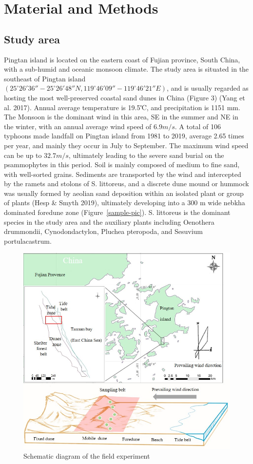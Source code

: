 \documentclass[]{interact}
\theoremstyle{plain}%
\theoremstyle{definition}
\theoremstyle{remark}
\begin{document}
\section{Material and Methods}
\subsection{Study area}

Pingtan island is located on the eastern coast of Fujian province, South China, with a sub-humid and oceanic monsoon climate. The study area is situated in the southeast of Pingtan island $(25^{\circ}26'36''-25^{\circ}26'48''N, 119^{\circ}46'09''-119^{\circ}46'21''E)$, and is usually regarded as hosting the most well-preserved coastal sand dunes in China (Figure 3) (Yang et al. 2017). Annual average temperature is 19.5℃, and precipitation is 1151 mm. The Monsoon is the dominant wind in this area, SE in the summer and NE in the winter, with an annual average wind speed of $6.9 m/s$. A total of 106 typhoons made landfall on Pingtan island from 1981 to 2019, average 2.65 times per year, and mainly they occur in July to September. The maximum wind speed can be up to $32.7 m/s$, ultimately leading to the severe sand burial on the psammophytes in this period. Soil is mainly composed of medium to fine sand, with well-sorted grains. Sediments are transported by the wind and intercepted by the ramets and stolons of S. littoreus, and a discrete dune mound or hummock was usually formed by aeolian sand deposition within an isolated plant or group of plants (Hesp \& Smyth 2019), ultimately developing into a 300 m wide nebkha dominated foredune zone (Figure~\ref{sample-pic}). S. littoreus is the dominant species in the study area and the auxiliary plants including Oenothera drummondii, Cynodondactylon, Pluchea pteropoda, and Sesuvium portulacastrum. 

\begin{figure}
  \centering
  \includegraphics[scale=0.8]{../figs/study_area.jpg}
  \caption{Schematic diagram of the field experiment} 
  \label{map}
\end{figure}
\end{document}
